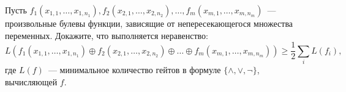 Пусть $f_1(x_{1, 1}, \dots, x_{1, n_1}), f_2(x_{2, 1}, \dots, x_{2, n_2}), \dots, f_m(x_{m, 1}, \dots,
x_{m, n_m})$~--- произвольные булевы функции, зависящие от непересекающегося множества
переменных. Докажите, что выполняется неравенство:
$$
    L(f_1(x_{1, 1}, \dots, x_{1, n_1}) \oplus f_2(x_{2, 1}, \dots, x_{2, n_2}) \oplus \dots \oplus
    f_m(x_{m, 1}, \dots, x_{m, n_m})) \ge \frac{1}{2} \sum\limits_{i} L(f_i),
$$
где $L(f)$~--- минимальное количество гейтов в формуле $\{\land, \lor, \neg\}$, вычисляющей $f$.